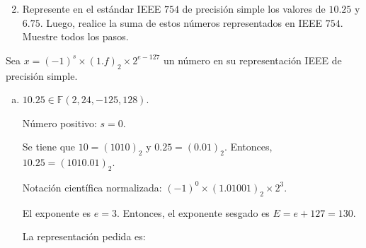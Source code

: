 \begin{frame}
	\begin{enumerate}\setcounter{enumi}{1}
		\item

		      Represente en el estándar IEEE $754$ de precisión simple
		      los valores de $10.25$ y $6.75$.
		      Luego, realice la suma de estos números representados en
		      IEEE $754$.
		      Muestre todos los pasos.
	\end{enumerate}

	\begin{solution}

		Sea
		\begin{math}
			x=
			{\left(-1\right)}^{s}\times
			{\left(1.f\right)}_{2}
			\times
			2^{e-127}
		\end{math}
		un número en su representación IEEE de precisión simple.

		\begin{enumerate}[a)]
			\item

			      \begin{math}
				      10.25\in\mathbb{F}\left(2,24,-125,128\right)
			      \end{math}.

			      Número positivo: $s=0$.

			      Se tiene que
			      \begin{math}
				      10=
				      {\left(1010\right)}_{2}
			      \end{math}
			      y
			      \begin{math}
				      0.25=
				      {\left(0.01\right)}_{2}
			      \end{math}.
			      Entonces,
			      \begin{math}
				      10.25=
				      {\left(1010.01\right)}_{2}
			      \end{math}.

			      Notación científica normalizada:
			      \begin{math}
				      {\left(-1\right)}^{0}\times
				      \left(1.01001\right)_{2}
				      \times 2^{3}
			      \end{math}.

			      El exponente es $e=3$.
			      Entonces, el exponente sesgado es
			      \begin{math}
				      E=
				      e+127=130
			      \end{math}.

			      La representación pedida es:


\end{enumerate}
\end{solution}
\end{frame}
